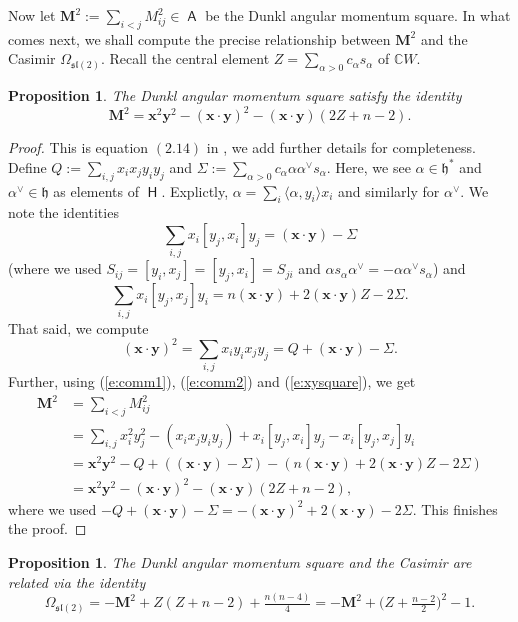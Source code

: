 \documentclass[10pt,a4paper]{amsart}
\numberwithin{equation}{section}
\newtheorem{Proposition}[Theorem]{Proposition}
 { \theoremstyle{definition}
\newtheorem{Definition}[Theorem]{Definition}
\newtheorem{Note}[Theorem]{Note}
\newtheorem{Example}[Theorem]{Example}
\newtheorem{Remark}[Theorem]{Remark} }
\newcommand{\fh}{\mathfrak{h}}
\newcommand{\fl}{\mathfrak{l}}
\newcommand{\fs}{\mathfrak{s}}
\newcommand{\bbc}{\mathbb{C}}
\newcommand{\bx}{\mathbf{x}}
\newcommand{\by}{\mathbf{y}}
\newcommand{\bM}{\mathbf{M}}
\DeclareMathOperator{\rca}{\mathsf{H}}
\DeclareMathOperator{\ama}{\mathsf{A}}
\begin{document}
Now let $\bM^2 := \sum_{i<j} M_{ij}^2\in\ama$ be the Dunkl angular momentum square. In what comes next, we shall compute the precise relationship between $\bM^2$ and the Casimir $\Omega_{\fs\fl(2)}$. Recall the central element $Z = \sum_{\alpha>0} c_\alpha s_\alpha$ of $\bbc W$.

\begin{Proposition}
The Dunkl angular momentum square satisfy the identity
\[
\bM^2 = \bx^2\by^2 - (\bx\cdot\by)^2 - (\bx\cdot\by)(2Z + n - 2).
\]
\end{Proposition}

\begin{proof} This is equation $(2.14)$ in \cite{FH15}, we add further details for completeness.
Define $Q := \sum_{i,j}x_ix_jy_iy_j$ and $\Sigma := \sum_{\alpha >0} c_\alpha\alpha\alpha^\vee s_\alpha$. Here, we see $\alpha\in\fh^*$ and $\alpha^\vee\in\fh$ as elements of $\rca$. Explictly, $\alpha = \sum_i \langle \alpha , y_i \rangle x_i$ and similarly for $\alpha^\vee$. We note the identities
\begin{equation}\label{e:comm1}
\sum_{i, j}x_i[y_j,x_i]y_j = (\bx\cdot\by) - \Sigma
\end{equation}
(where we used $S_{ij}=[y_i,x_j]=[y_j,x_i]=S_{ji}$ and $\alpha s_\alpha \alpha^\vee = -\alpha \alpha^\vee s_\alpha$) and
\begin{equation}\label{e:comm2}
\sum_{i, j}x_i[y_j,x_j]y_i
= n(\bx\cdot \by)+2(\bx\cdot\by)Z - 2\Sigma.
\end{equation}
That said, we compute
\begin{equation}\label{e:xysquare}
(\bx\cdot\by)^2 = \sum_{i,j} x_iy_ix_j y_j
= Q + (\bx\cdot\by) - \Sigma.
\end{equation}
Further,
using (\ref{e:comm1}), (\ref{e:comm2}) and (\ref{e:xysquare}), we get
\begin{align*}
\bM^2 &= \sum_{i<j} M_{ij}^2\\
&= \sum_{i,j} x_i^2y_j^2 - (x_ix_jy_iy_j) +x_i[y_j,x_i]y_j - x_i[y_j,x_j]y_i \\
&= \bx^2\by^2 -Q + ((\bx\cdot\by) - \Sigma) - (n(\bx\cdot\by)+2(\bx\cdot\by)Z - 2\Sigma)\\
&= \bx^2\by^2 - (\bx\cdot\by)^2 - (\bx\cdot\by)(2Z + n - 2),
\end{align*}
where we used $-Q + (\bx\cdot\by) - \Sigma = -(\bx\cdot\by)^2 + 2(\bx\cdot\by) - 2\Sigma$. This finishes the proof.
\end{proof}

\begin{Proposition}\label{p:CasM2}
The Dunkl angular momentum square and the Casimir are related via the identity
\[
\Omega_{\fs\fl(2)} = -\bM^2 + Z(Z + n - 2) + \tfrac{n(n-4)}{4} = -\bM^2 + \big(Z + \tfrac{n-2}{2}\big)^2 - 1.
\]
\end{Proposition}
\end{document}
